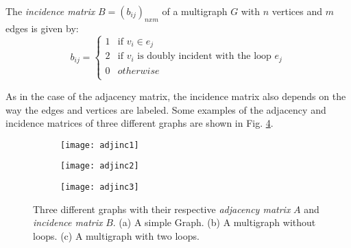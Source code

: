 \begin{defn}
	The \textit{incidence matrix} $ B= (b_{ij})_{nxm}$ of a multigraph $G$ with $n$ vertices and $m$ edges is given by:
\begin{equation}
		b_{ij} = \begin{cases}
		1 & \text{if $v_{i} \in e_{j}$} \\
		2 & \text{if $v_{i}$ is doubly incident with the loop $e_{j}$} \\
		0 & otherwise \\
		\end{cases}
\end{equation}
\end{defn}


As in the case of the adjacency matrix, the incidence matrix also depends on the way the edges and vertices are labeled. Some examples of the adjacency and incidence matrices of three different graphs are shown in Fig. \ref{fig:adjinc}.

\begin{figure}
	\centering
	\begin{subfigure}[b]{0.3\textwidth}
		\centering
		\texttt{[image: adjinc1]}
		\caption{}
		\label{fig:adjinc1}
	\end{subfigure}
	\hfill
	\begin{subfigure}[b]{0.3\textwidth}
		\centering
		\texttt{[image: adjinc2]}
		\caption{}
		\label{fig:adjinc2}
	\end{subfigure}
	\begin{subfigure}[b]{0.3\textwidth}
		\centering
		\texttt{[image: adjinc3]}
		\caption{}
		\label{fig:adjinc3}
	\end{subfigure}
	\caption[Adjacency and incidence matrices.]{Three different graphs with their respective \textit{adjacency matrix} $A$ and \textit{incidence matrix} $B$. (a) A simple Graph. (b) A multigraph without loops. (c) A multigraph with two loops.}
	\label{fig:adjinc}
\end{figure}

